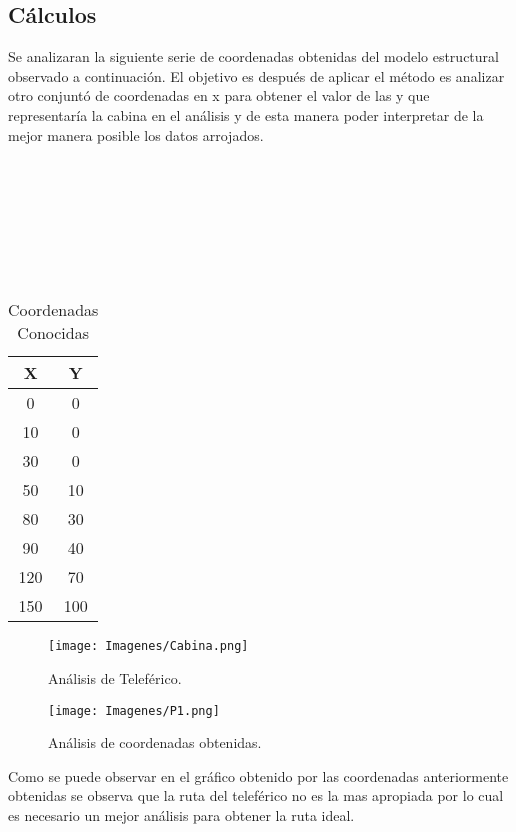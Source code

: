 \documentclass[fleqn,10pt]{olplainarticle}
\begin{document}
\subsection*{Cálculos}
Se analizaran la siguiente serie de coordenadas obtenidas del modelo estructural observado a continuación.
El objetivo es después de aplicar el método es analizar otro conjuntó de coordenadas en x para obtener el valor de las y que representaría la cabina en el análisis y de esta manera poder interpretar de la mejor manera posible los datos arrojados.
 \\
 \\
 \\
 \\
 \\
 \\
 \\
 \\
 \begin{table}[ht]
    \begin{center}
    \begin{tabular}{| c | c | }
    \hline
         X & Y \\ \hline
         0 & 0 \\
         10 & 0 \\
         30 & 0 \\
         50 & 10 \\
         80 & 30 \\
         90 & 40 \\
         120 & 70 \\
         150 & 100 \\ \hline
    \end{tabular}
    \caption{Coordenadas Conocidas}
    \end{center}
\end{table}

\begin{figure}[h!]
\centering
\texttt{[image: Imagenes/Cabina.png]}
\caption{Análisis de Teleférico.}
\end{figure}

\begin{figure}[h!]
\centering
\texttt{[image: Imagenes/P1.png]}
\caption{Análisis de coordenadas obtenidas.}
\end{figure}

Como se puede observar en el gráfico obtenido por las coordenadas anteriormente obtenidas se observa que la ruta del teleférico no es la mas apropiada por lo cual es necesario un mejor análisis para obtener la ruta ideal.
\smallskip
\end{document}
